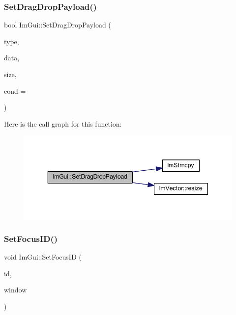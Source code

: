 \subsubsection{\texorpdfstring{Set\+Drag\+Drop\+Payload()}{SetDragDropPayload()}}
{\footnotesize\ttfamily bool Im\+Gui\+::\+Set\+Drag\+Drop\+Payload (\begin{DoxyParamCaption}\item[{const char $\ast$}]{type,  }\item[{const void $\ast$}]{data,  }\item[{size\+\_\+t}]{size,  }\item[{\mbox{\hyperlink{imgui_8h_aef890d6ac872e12c5804d0b3e4f7f103}{Im\+Gui\+Cond}}}]{cond = {} }\end{DoxyParamCaption})}

Here is the call graph for this function\+:
\nopagebreak
\begin{figure}[H]
\begin{center}
\leavevmode
\includegraphics[width=343pt]{namespace_im_gui_adc77aecd872e578e347d8bc0dfcfa663_cgraph}
\end{center}
\end{figure}
\mbox{\label{namespace_im_gui_a8ad578d7141486ff12b59b0c251234e6}} 
\subsubsection{\texorpdfstring{Set\+Focus\+I\+D()}{SetFocusID()}}
{\footnotesize\ttfamily void Im\+Gui\+::\+Set\+Focus\+ID (\begin{DoxyParamCaption}\item[{\mbox{\hyperlink{imgui_8h_a1785c9b6f4e16406764a85f32582236f}{Im\+Gui\+ID}}}]{id,  }\item[{\mbox{\hyperlink{struct_im_gui_window}{Im\+Gui\+Window}} $\ast$}]{window }\end{DoxyParamCaption})}

